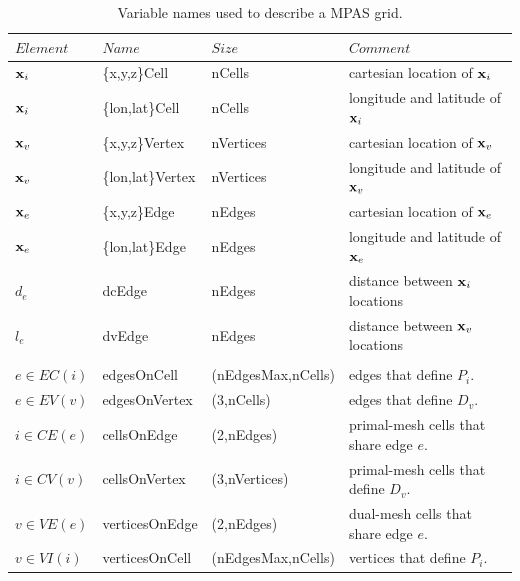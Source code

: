 \begin{table}[t]
\caption{Variable names used to describe a MPAS grid.}
\label{table:gridFileName}
\begin{center}
\begin{tabular}{llll}
\hline\hline
$Element$ & $Name$ & $Size$ & $Comment$\\
\hline
 ${\bf x}_i$   & \{x,y,z\}Cell          & nCells  & cartesian location of ${\bf x}_i$  \\
 ${\bf x}_i$   & \{lon,lat\}Cell        & nCells  & longitude and latitude of  ${\bf x}_i$  \\
 ${\bf x}_v$   & \{x,y,z\}Vertex      & nVertices  & cartesian location of ${\bf x}_v$  \\
 ${\bf x}_v$   & \{lon,lat\}Vertex    & nVertices  & longitude and latitude of  ${\bf x}_v$  \\
 ${\bf x}_e$   & \{x,y,z\}Edge          & nEdges  & cartesian location of ${\bf x}_e$  \\
 ${\bf x}_e$   & \{lon,lat\}Edge        & nEdges  & longitude and latitude of  ${\bf x}_e$  \\
 $d_{e}$       & dcEdge                   & nEdges  & distance between ${\bf x}_i$ locations\\
 $l_{e}$         & dvEdge             & nEdges &  distance between ${\bf x}_v$ locations \\
  &  & & \\
 $e \in EC(i) $   &  edgesOnCell  & (nEdgesMax,nCells) & edges that define $P_i$. \\
 $e \in EV(v) $     & edgesOnVertex &  (3,nCells) & edges that define $D_v$. \\
 $i \in CE(e) $      & cellsOnEdge &  (2,nEdges) &  primal-mesh cells that share edge $e$. \\
 $i \in CV(v) $  &   cellsOnVertex &  (3,nVertices) &  primal-mesh cells that define $D_v$. \\
 $v\in VE(e) $  & verticesOnEdge &  (2,nEdges) &    dual-mesh cells that share edge $e$. \\
 $v \in VI(i) $   & verticesOnCell &  (nEdgesMax,nCells) & vertices that define $P_i$. \\
\hline
\end{tabular}
\end{center}
\end{table}
%



